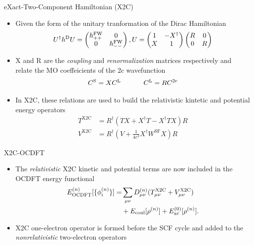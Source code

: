 \documentclass[t]{beamer}
\begin{document}
\begin{frame}{eXact-Two-Component Hamiltonian (X2C)}
\begin{itemize}
\item Given the form of the unitary tranformation of the Dirac Hamiltonian
\begin{equation}
U^\dagger h^{\rm D} U = 
 \begin{pmatrix}
h^{\rm FW}_{++} & 0 \\
0 & h^{\rm FW}_{--}
\end{pmatrix},
U = 
\begin{pmatrix}
1 & -X^{\dagger} \\
X & 1
\end{pmatrix}
\begin{pmatrix}
R & 0 \\
0 & R
\end{pmatrix}
\end{equation}
\item X and R are the \textit{coupling} and \textit{renormalization} matrices respectively and relate the MO coeffeicients of the 2c wavefunction
\begin{equation}
C^{\rm S} = XC^{\rm L} \ \ \ \ \ \ \ \ \ \ C^{\rm L} = R C^{\rm 2c}
\end{equation}
\item In X2C, these relations are used to build the relativistic kintetic and potential energy operators
\begin{align}
	T^{\text{X2C}}&= R^{\dagger} (TX +  {X}^{\dagger}T - {X}^{\dagger}TX ) R \\ 
	V^{\text{X2C}} &=  R^{\dagger}(V + \frac{1}{4c^2} X^{\dagger}W^{\text{SF}}X) R
\end{align}
\end{itemize}
\end{frame}

\begin{frame}{X2C-OCDFT}
\begin{itemize}
\item The \textit{relativistic} X2C kinetic and potential terms are now included in the OCDFT energy functional
\begin{align}
\nonumber
E^{(n)}_{\rm OCDFT}[\{\phi^{(n)}_i\}]=& \sum_{\mu \nu} D^{(n)}_{\mu \nu}(T^{\rm X2C}_{\mu \nu} + V^{\rm X2C}_{\mu \nu})\\
 &+ E_{\rm coul}[\rho^{(n)}] + E^{(0)}_{\rm xc}[\rho^{(n)}]. 
\end{align}
\item X2C one-electron operator is formed before the SCF cycle and added to the \textit{nonrelativistic} two-electron operators
\end{itemize}
\end{frame}
\end{document}
